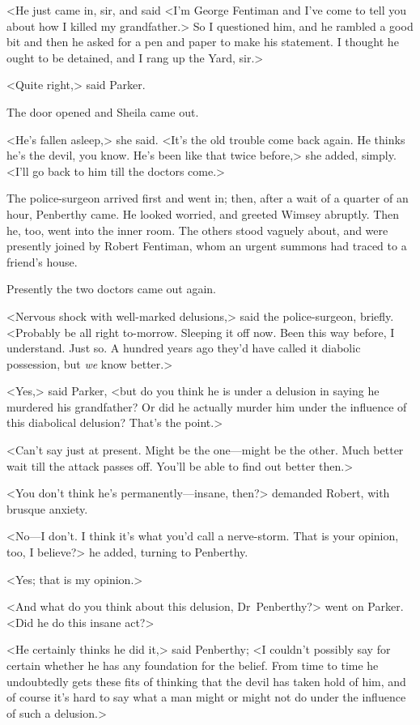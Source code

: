 <He just came in, sir, and said <I'm George Fentiman and I've come to tell you about how I killed my grandfather.> So I questioned him, and he rambled a good bit and then he asked for a pen and paper to make his statement. I thought he ought to be detained, and I rang up the Yard, sir.>

<Quite right,> said Parker.

The door opened and Sheila came out.

<He's fallen asleep,> she said. <It's the old trouble come back again. He thinks he's the devil, you know. He's been like that twice before,> she added, simply. <I'll go back to him till the doctors come.>

The police-surgeon arrived first and went in; then, after a wait of a quarter of an hour, Penberthy came. He looked worried, and greeted Wimsey abruptly. Then he, too, went into the inner room. The others stood vaguely about, and were presently joined by Robert Fentiman, whom an urgent summons had traced to a friend's house.

Presently the two doctors came out again.

<Nervous shock with well-marked delusions,> said the police-surgeon, briefly. <Probably be all right to-morrow. Sleeping it off now. Been this way before, I understand. Just so. A hundred years ago they'd have called it diabolic possession, but \emph{we} know better.>

<Yes,> said Parker, <but do you think he is under a delusion in saying he murdered his grandfather? Or did he actually murder him under the influence of this diabolical delusion? That's the point.>

<Can't say just at present. Might be the one—might be the other. Much better wait till the attack passes off. You'll be able to find out better then.>

<You don't think he's permanently—insane, then?> demanded Robert, with brusque anxiety.

<No—I don't. I think it's what you'd call a nerve-storm. That is your opinion, too, I believe?> he added, turning to Penberthy.

<Yes; that is my opinion.>

<And what do you think about this delusion, Dr~Penberthy?> went on Parker. <Did he do this insane act?>

<He certainly thinks he did it,> said Penberthy; <I couldn't possibly say for certain whether he has any foundation for the belief. From time to time he undoubtedly gets these fits of thinking that the devil has taken hold of him, and of course it's hard to say what a man might or might not do under the influence of such a delusion.>

